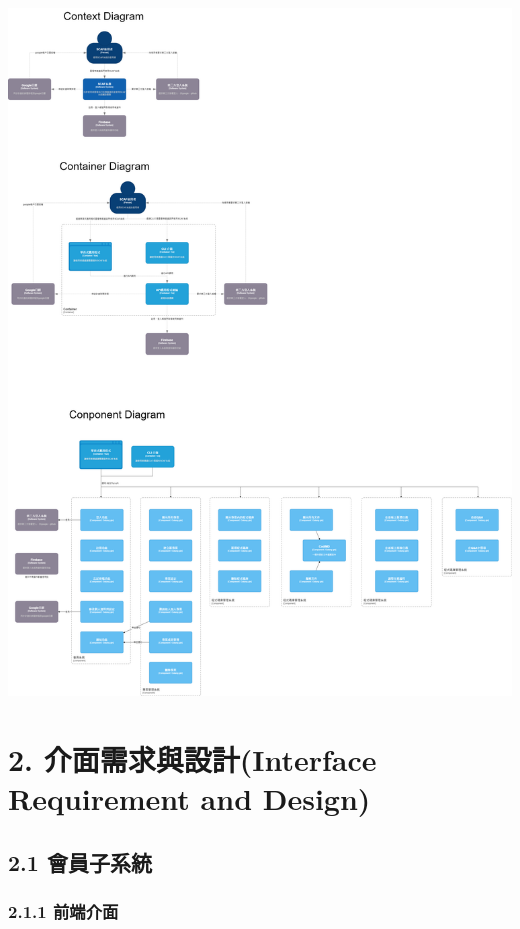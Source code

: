 \documentclass{report}
\begin{document}
\includegraphics[width=\textwidth]{assets/SCAFC4.png}

\section*{2. 介面需求與設計(Interface Requirement and Design)}

\newcolumntype{R}{X}

\subsection*{2.1 會員子系統}

\subsubsection*{2.1.1 前端介面}
\end{document}
